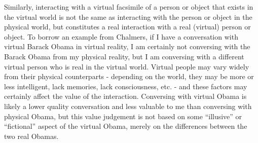 Similarly, interacting with a virtual facsimile of a person or object that
exists in the virtual world is not the same as interacting with the person or
object in the physical world, but constitutes a real interaction with a real 
(virtual) person or object. To borrow an example from Chalmers, if I have a 
conversation with virtual Barack Obama in virtual reality, I am certainly not
conversing with the Barack Obama from my physical reality, but I am conversing 
with a different virtual person who is real in the virtual world. Virtual people
may vary widely from their physical counterparts - depending on the world, they
may be more or less intelligent, lack memories, lack consciousness, etc. - and
these factors may certainly affect the value of the interaction. Conversing with
virtual Obama is likely a lower quality conversation and less valuable to me
than conversing with physical Obama, but this value judgement is not based on
some ``illusive'' or ``fictional'' aspect of the virtual Obama, merely on the
differences between the two real Obamas.
